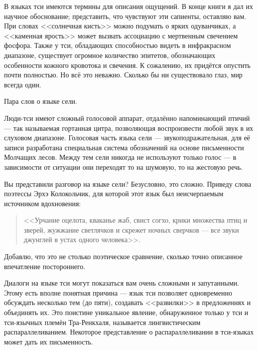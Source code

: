 В языках тси имеются термины для описания ощущений.
В конце книги я дал их научное обоснование; представить, что чувствуют эти сапиенты, оставляю вам.
При словах <<солнечная кисть>> можно подумать о ярких одуванчиках, а <<каменная ярость>> может вызвать ассоциацию с мертвенным свечением фосфора.
Также у тси, обладающих способностью видеть в инфракрасном диапазоне, существует огромное количество эпитетов, обозначающих особенности кожного кровотока и свечения.
К сожалению, их придётся опустить почти полностью.
Но всё это неважно.
Сколько бы ни существовало глаз, мир всегда один.

Пара слов о языке сели.

Люди-тси имеют сложный голосовой аппарат, отдалённо напоминающий птичий --- так называемая гортанная цитра, позволяющая воспроизвести любой звук в их слуховом диапазоне.
Голосовая часть языка сели --- звукоподражательная\FM, для её записи разработана специальная система обозначений на основе письменности Молчащих лесов.
Между тем сели никогда не используют только голос --- в зависимости от ситуации они переходят то на шумовую, то на жестовую речь.

Вы представили разговор на языке сели?
Безусловно, это сложно.
Приведу слова поэтессы Эрхэ Колокольчик, для которой этот язык был неисчерпаемым источником вдохновения:

\begin{quote}
<<Урчание оцелота, кваканье жаб, свист согхо, крики множества птиц и зверей, жужжание светлячков и скрежет ночных сверчков --- все звуки джунглей в устах одного человека>>.
\end{quote}

Добавлю, что это не столько поэтическое сравнение, сколько точно описанное впечатление постороннего.

Диалоги на языке тси могут показаться вам очень сложными и запутанными.
Этому есть вполне понятная причина --- язык тси позволяет одновременно обсуждать несколько тем (до пяти), создавать <<развилки>> в предложениях и объединять их.
Это поистине уникальное явление, обнаруженное только у тси и тси-язычных племён Тра-Ренкхаля, называется лингвистическим распараллеливанием.
Некоторое представление о распараллеливании в тси-языках может дать их письменность\FM.

